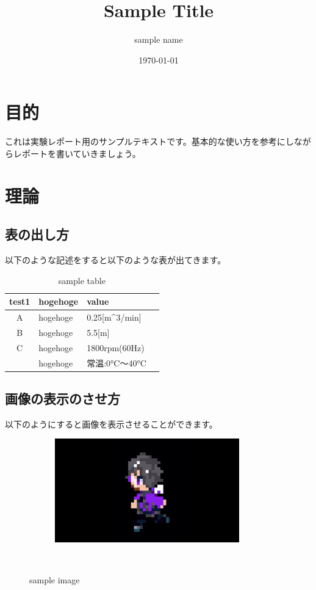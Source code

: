 \documentclass{jarticle}
\title{Sample Title}
\date{\today}
\author{sample name}
\begin{document}
 
\maketitle
\thispagestyle{empty} %
\newpage%

\setcounter{tocdepth}{2}
\tableofcontents
\newpage

\section{目的}
これは実験レポート用のサンプルテキストです。基本的な使い方を参考にしながらレポートを書いていきましょう。

\section{理論}
\subsection{表の出し方}
以下のような記述をすると以下のような表が出てきます。

\begin{table}[h]
 \caption{sample table}
 \label{table:SpeedOfLight}
 \centering
  \begin{tabular}{clll}
   \hline
   test1 & hogehoge & value  \\
   \hline \hline
   A & hogehoge & 0.25[m^3/min] \\
   B & hogehoge & 5.5[m]  \\
   C & hogehoge & 1800rpm(60Hz)  \\
      & hogehoge & 常温:0°C～40°C  \\
   \hline
  \end{tabular}
\end{table}

\subsection{画像の表示のさせ方}
以下のようにすると画像を表示させることができます。

\begin{figure}[h]%
    \centering
　　　\includegraphics[width=80mm]{img/sample.png}
　　　\caption{sample image}
　  \label{fig1}
\end{figure}
\end{document}
